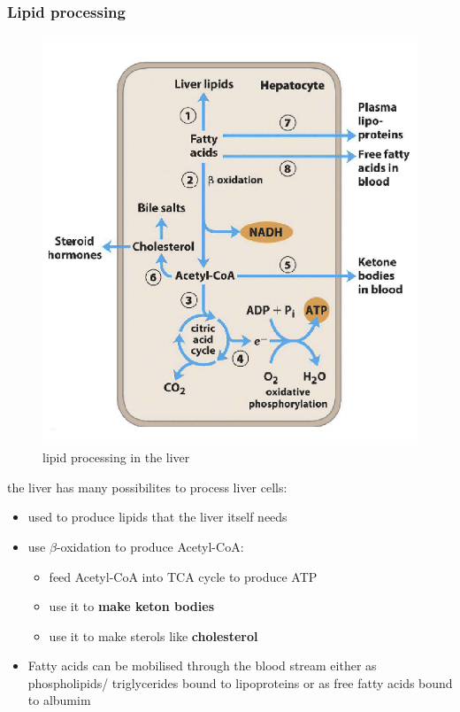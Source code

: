 \documentclass[../main.tex]{subfiles}
\begin{document}
\subsubsection{Lipid processing}
\begin{figure}[H]
    \centering
    \includegraphics[width=0.5\linewidth]{liverLipids.png}
    \caption{lipid processing in the liver}
    \label{fig:enter-label}
\end{figure}
the liver has many possibilites to process liver cells:
\begin{itemize}
    \item used to produce lipids that the liver itself needs
    \item use $\beta$-oxidation to produce Acetyl-CoA:
    \begin{itemize}
        \item feed Acetyl-CoA into TCA cycle to produce ATP
        \item use it to \textbf{make keton bodies}
        \item use it to make sterols like \textbf{cholesterol}
    \end{itemize}
    \item Fatty acids can be mobilised 
    through the blood stream either as 
    phospholipids/ triglycerides bound to 
    lipoproteins or as free fatty acids bound 
    to albumim
\end{itemize}
\end{document}
